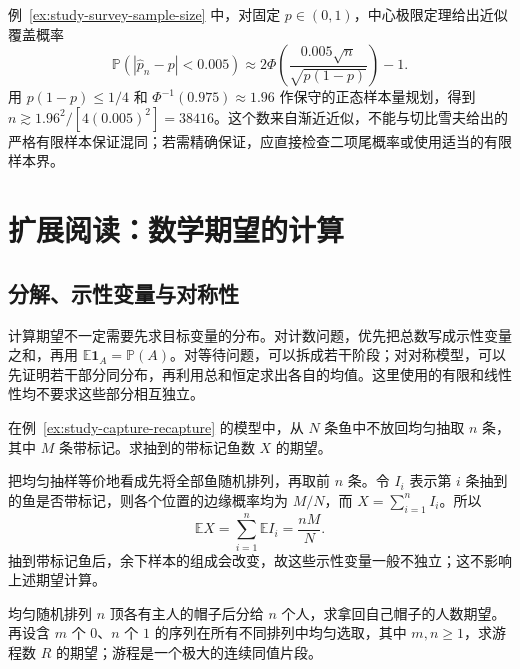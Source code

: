 例~\ref{ex:study-survey-sample-size} 中，对固定 $p\in(0,1)$，中心极限定理给出近似覆盖概率
\[
  \mathbb P(|\widehat p_n-p|<0.005)
    \approx2\Phi\left(\frac{0.005\sqrt n}{\sqrt{p(1-p)}}\right)-1.
\]
用 $p(1-p)\le1/4$ 和 $\Phi^{-1}(0.975)\approx1.96$ 作保守的正态样本量规划，得到 $n\gtrsim1.96^2/[4(0.005)^2]=38416$。这个数来自渐近近似，不能与切比雪夫给出的严格有限样本保证混同；若需精确保证，应直接检查二项尾概率或使用适当的有限样本界。

\section{扩展阅读：数学期望的计算}
\label{sec:study-expectation-calculation}

\subsection{分解、示性变量与对称性}
\label{subsec:study-indicator-expectation-method}

计算期望不一定需要先求目标变量的分布。对计数问题，优先把总数写成示性变量之和，再用 $\mathbb E\mathbf1_A=\mathbb P(A)$。对等待问题，可以拆成若干阶段；对对称模型，可以先证明若干部分同分布，再利用总和恒定求出各自的均值。这里使用的有限和线性性均不要求这些部分相互独立。

\begin{example}
\label{ex:study-hypergeometric-mean}
在例~\ref{ex:study-capture-recapture} 的模型中，从 $N$ 条鱼中不放回均匀抽取 $n$ 条，其中 $M$ 条带标记。求抽到的带标记鱼数 $X$ 的期望。
\end{example}

\begin{solve}
把均匀抽样等价地看成先将全部鱼随机排列，再取前 $n$ 条。令 $I_i$ 表示第 $i$ 条抽到的鱼是否带标记，则各个位置的边缘概率均为 $M/N$，而 $X=\sum_{i=1}^nI_i$。所以
\[
  \mathbb E X=\sum_{i=1}^n\mathbb E I_i=\frac{nM}{N}.
\]
抽到带标记鱼后，余下样本的组成会改变，故这些示性变量一般不独立；这不影响上述期望计算。
\end{solve}

\begin{example}
\label{ex:study-matching-runs}
均匀随机排列 $n$ 顶各有主人的帽子后分给 $n$ 个人，求拿回自己帽子的人数期望。再设含 $m$ 个 $0$、$n$ 个 $1$ 的序列在所有不同排列中均匀选取，其中 $m,n\ge1$，求游程数 $R$ 的期望；游程是一个极大的连续同值片段。
\end{example}


